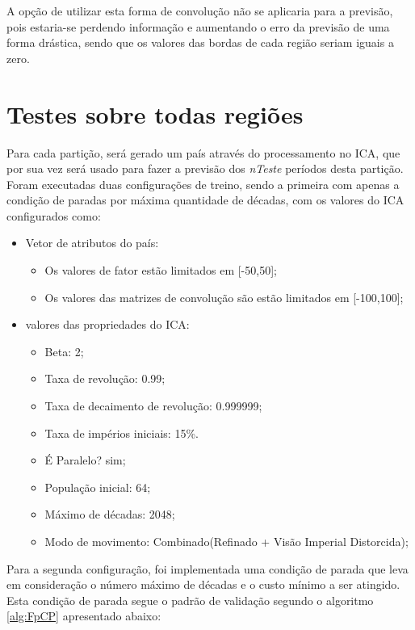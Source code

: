 A opção de utilizar esta forma de convolução não se aplicaria para a previsão, pois estaria-se perdendo informação e aumentando o erro da previsão de uma forma drástica, sendo que os valores das bordas de cada região seriam iguais a zero.





\section{Testes sobre todas regiões}
\label{Exp:Testes sobre todas regiões}


Para cada partição, será gerado um país através do processamento no ICA, que por sua vez será usado para fazer a previsão dos \emph{nTeste} períodos desta partição. Foram  executadas duas configurações de treino, sendo a primeira com apenas a condição de paradas por máxima quantidade de décadas, com os valores do ICA configurados como:

\begin{itemize}
\item Vetor de atributos do país:

  \begin{itemize}
  \item Os valores de fator estão limitados em [-50,50];
  \item Os valores das matrizes de convolução são estão limitados em [-100,100];
  \end{itemize}

\item valores das propriedades do ICA:

  \begin{itemize}
  \item Beta: 2;
  \item Taxa de revolução: 0.99;
  \item Taxa de decaimento de revolução: 0.999999;
  \item Taxa de impérios iniciais: 15\%.
  \item É Paralelo? sim;
  \item População inicial: 64;
  \item Máximo de décadas: 2048;
  \item Modo de movimento: Combinado(Refinado + Visão Imperial Distorcida);
  \end{itemize}

\end{itemize}

Para a segunda configuração, foi implementada uma condição de parada que leva em consideração o número máximo de décadas e o custo mínimo a ser atingido. Esta condição de parada segue o padrão de validação segundo o algoritmo \ref{alg:FpCP} apresentado abaixo:
	
